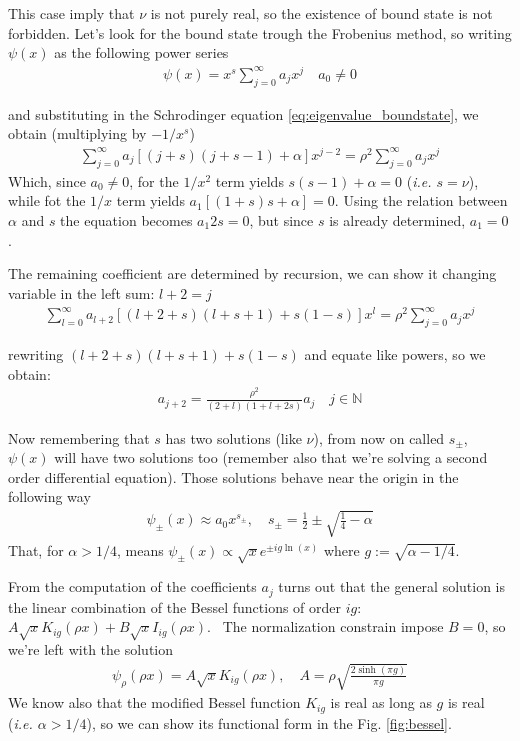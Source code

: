 This case imply that $\nu$ is not purely real, so the existence of bound state is not forbidden. Let's look for the bound state trough the Frobenius method, so writing $\psi(x)$ as the following power series
\begin{align*}
    \psi(x) = x^s \sum_{j=0}^{\infty} a_j x^j \quad a_0 \neq 0
\end{align*}

and substituting in the Schrodinger equation \eqref{eq:eigenvalue_boundstate}, we obtain (multiplying by $-1/x^s$)
\begin{align*}
    \sum_{j=0}^{\infty} a_j [(j+s)(j+s-1) + \alpha] x^{j-2} = \rho^2 \sum_{j=0}^{\infty} a_j x^j
\end{align*}
Which, since $a_0 \neq 0$, for the $1/x^2$ term yields $s(s-1)+\alpha = 0$ (\textit{i.e. $s = \nu$}), while fot the $1/x$ term yields $a_1 [(1+s)s + \alpha] = 0$. Using the relation between $\alpha$ and $s$ the equation becomes $a_1 2 s = 0$, but since $s$ is already determined, $a_1 = 0$.

The remaining coefficient are determined by recursion, we can show it changing variable in the left sum: $l + 2 = j$
\begin{align*}
    \sum_{l=0}^{\infty} a_{l+2} [(l+2+s)(l+s+1) + s(1-s)] x^{l} = \rho^2 \sum_{j=0}^{\infty} a_j x^j
\end{align*}

rewriting $(l+2+s)(l+s+1) + s(1-s) $ and equate like powers, so we obtain:
\begin{align*}
    a_{j+2} = \frac{\rho^2}{(2+l)(1+l+2s)} a_j \quad j \in \mathbb{N}
\end{align*}

\noindent
Now remembering that $s$ has two solutions (like $\nu$), from now on called $s_\pm$, $\psi(x)$ will have two solutions too (remember also that we're solving a second order differential equation). Those solutions behave near the origin in the following way
\begin{align*}
    \psi_\pm (x) \approx a_0 x^{s_\pm}, \quad s_\pm = \frac{1}{2} \pm \sqrt{\frac{1}{4} - \alpha}
\end{align*}
That, for $\alpha > 1/4$, means $\psi_\pm (x) \propto \sqrt{x} e^{\pm ig \ln(x)}$ where $g := \sqrt{\alpha-1/4}$.

\vspace{4mm}
\noindent
From the computation of the coefficients $a_j$ turns out that the general solution is the linear combination of the Bessel functions of order $ig$: $A \sqrt{x} K_{ig}(\rho x) + B \sqrt{x} I_{ig}(\rho x)$.~\cite{garfken67:math} The normalization constrain impose $B=0$, so we're left with the solution~\cite{gradshteyn2007}
\begin{align*}
    \psi_\rho(\rho x) = A \sqrt{x} K_{ig}(\rho x), \quad A = \rho \sqrt{\frac{2 \sinh(\pi g)}{\pi g}}
\end{align*}
We know also that the modified Bessel function $K_{ig}$ is real as long as $g$ is real (\textit{i.e. $\alpha>1/4$}), so we can show its functional form in the Fig. \ref{fig:bessel}.

